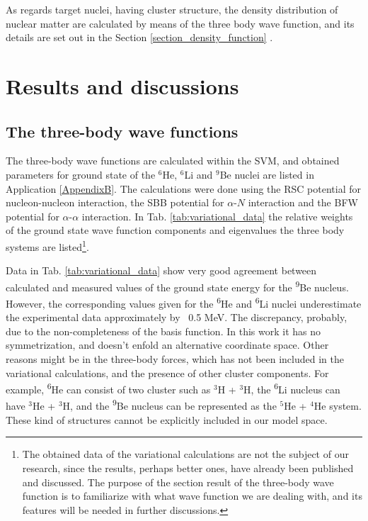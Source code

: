 \documentclass[
12pt, %
oneside, %
english, %
onehalfspacing, %
onehalfspacing, %
headsepline, %
]{MastersDoctoralThesis} %
\newcommand{\he}{\textsuperscript{6}He\xspace}
\newcommand{\li}{\textsuperscript{6}Li\xspace}
\newcommand{\be}{\textsuperscript{9}Be\xspace}
\begin{document}
  
As regards target nuclei, having cluster structure, the density distribution of nuclear matter are calculated by means of the three body wave function, and its details are set out in the Section \ref{section_density_function} .

\chapter{Results and discussions}

\section{The three-body wave functions}
\label{section:3bwf}
The three-body wave functions are calculated within the SVM, and obtained parameters for ground state of the $^6$He, $^6$Li and $^9$Be nuclei are listed in Application \ref{AppendixB}. 
The calculations were done using the RSC potential \cite{day1981three} for nucleon-nucleon interaction, 
the SBB potential \cite{sack1954elastic} for  $\alpha$-$N$ interaction and the BFW potential \cite{buck1977local} for $\alpha$-$\alpha$ interaction.  
In Tab. \ref{tab:variational_data} the relative weights of the ground state wave function components and eigenvalues the three body systems are listed\footnote{The obtained data of the variational calculations are not the subject of our research, since the results, perhaps better ones, have already been published and discussed. The purpose of  the section result of the three-body wave function   is to familiarize with what wave function we are dealing with, and its features will be needed in further discussions.}.

Data in Tab. \ref{tab:variational_data} show very good agreement between calculated and measured values of the ground state energy for the \be nucleus.
However, the corresponding values given for the \he and \li nuclei underestimate the experimental data approximately by ~0.5 MeV. 
The discrepancy, probably, due to the non-completeness of the basis function. 
In this work it has no symmetrization, and doesn't enfold an alternative coordinate space.
Other reasons might be in the three-body forces, which has not been included in the variational calculations, and the presence of other cluster components. 
For example, \he can consist of two cluster such as $^3$H + $^3$H, 
the \li nucleus can have $^3$He + $^3$H, and the \be nucleus can be represented as the $^5$He + $^4$He system.
These kind of structures cannot be explicitly included in our model space.
 
\end{document}
